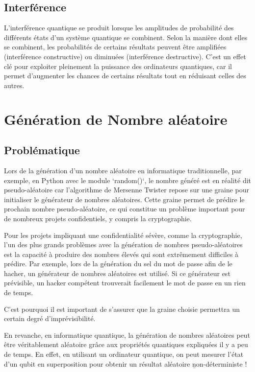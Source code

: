 \documentclass{article}
\begin{document}
\subsection{Interférence}

L'interférence quantique se produit lorsque les amplitudes de probabilité des différents états d'un système quantique se combinent. Selon la manière dont elles se combinent, les probabilités de certains résultats peuvent être amplifiées (interférence constructive) ou diminuées (interférence destructive). C’est un effet clé pour exploiter pleinement la puissance des ordinateurs quantiques, car il permet d’augmenter les chances de certains résultats tout en réduisant celles des autres.


\break\section{Génération de Nombre aléatoire}
\subsection{Problématique}

Lors de la génération d'un nombre aléatoire en informatique traditionnelle, par exemple, en Python avec le module `random()`, le nombre généré est en réalité dit pseudo-aléatoire car l'algorithme de Mersenne Twister repose sur une graine pour initialiser le générateur de nombres aléatoires. Cette graine permet de prédire le prochain nombre pseudo-aléatoire, ce qui constitue un problème important pour de nombreux projets confidentiels, y compris la cryptographie.

Pour les projets impliquant une confidentialité sévère, comme la cryptographie, l'un des plus grands problèmes avec la génération de nombres pseudo-aléatoires est la capacité à produire des nombres élevés qui sont extrêmement difficiles à prédire. Par exemple, lors de la génération du sel du mot de passe afin de le hacher, un générateur de nombres aléatoires est utilisé. Si ce générateur est prévisible, un hacker compétent trouverait facilement le mot de passe en un rien de temps.

C'est pourquoi il est important de s'assurer que la graine choisie permettra un certain degré d'imprévisibilité.

En revanche, en informatique quantique, 
la génération de nombres aléatoires peut être véritablement aléatoire grâce aux propriétés 
quantiques expliquées il y a peu de temps. En effet, en utilisant un ordinateur 
quantique, on peut mesurer l'état d'un qubit en superposition pour obtenir un résultat aléatoire \b{non-déterministe} !
\end{document}

